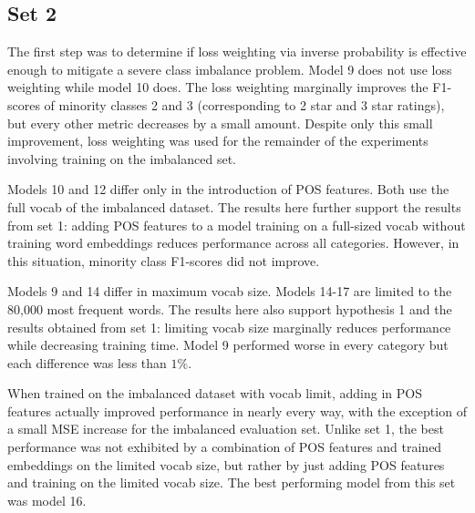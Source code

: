 \subsection{Set 2}
The first step was to determine if loss weighting via inverse probability is effective enough to mitigate a severe class imbalance problem. Model 9 does not use loss weighting while model 10 does. The loss weighting marginally improves the F1-scores of minority classes 2 and 3 (corresponding to 2 star and 3 star ratings), but every other metric decreases by a small amount. Despite only this small improvement, loss weighting was used for the remainder of the experiments involving training on the imbalanced set.
\par 
Models 10 and 12 differ only in the introduction of POS features. Both use the full vocab of the imbalanced dataset. The results here further support the results from set 1: adding POS features to a model training on a full-sized vocab without training word embeddings reduces performance across all categories. However, in this situation, minority class F1-scores did not improve.
\par 
Models 9 and 14 differ in maximum vocab size. Models 14-17 are limited to the 80,000 most frequent words. The results here also support hypothesis 1 and the results obtained from set 1: limiting vocab size marginally reduces performance while decreasing training time. Model 9 performed worse in every category but each difference was less than $1\%$.
\par 
When trained on the imbalanced dataset with vocab limit, adding in POS features actually improved performance in nearly every way, with the exception of a small MSE increase for the imbalanced evaluation set. Unlike set 1, the best performance was not exhibited by a combination of POS features and trained embeddings on the limited vocab size, but rather by just adding POS features and training on the limited vocab size. The best performing model from this set was model 16.
